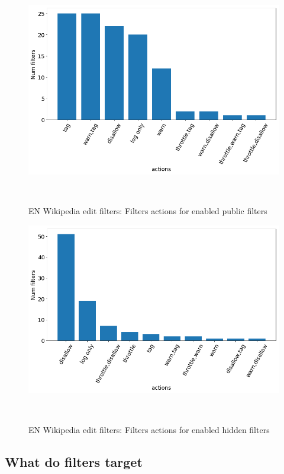 \begin{figure}
\centering
  \includegraphics[width=0.9\columnwidth]{pics/active-public-actions-big.png}
  \caption{EN Wikipedia edit filters: Filters actions for enabled public filters}~\label{fig:active-public-actions}
\end{figure}

\begin{figure}
\centering
  \includegraphics[width=0.9\columnwidth]{pics/active-hidden-actions-big.png}
  \caption{EN Wikipedia edit filters: Filters actions for enabled hidden filters}~\label{fig:active-hidden-actions}
\end{figure}

\subsection{What do filters target}%

